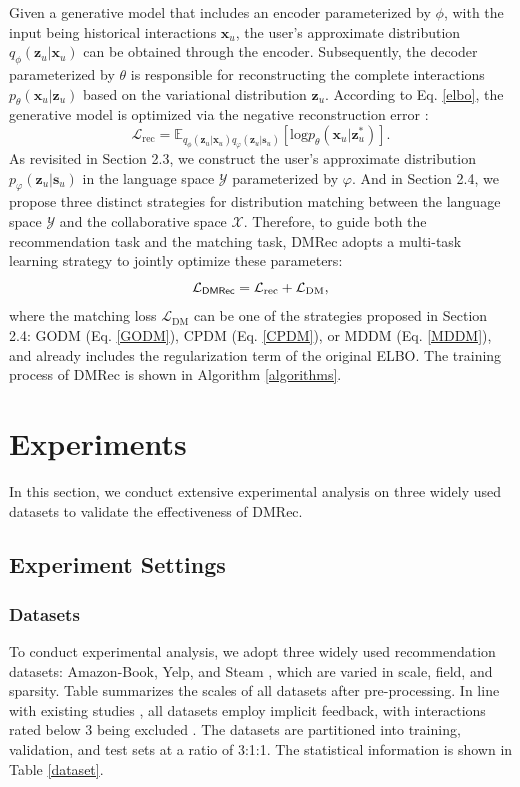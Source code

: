 \documentclass[sigconf]{acmart}
\begin{document}
Given a generative model that includes an encoder parameterized by $\phi$, with the input being historical interactions $\mathbf x_u$, the user's approximate distribution $q_{\phi}(\mathbf z_u|\mathbf x_u)$ can be obtained through the encoder. Subsequently, the decoder parameterized by $\theta$ is responsible for reconstructing the complete interactions $p_{\theta}(\mathbf x_u|\mathbf z_u) $ based on the variational distribution $\mathbf z_u$. According to Eq. \ref{elbo}, the generative model is optimized via the negative reconstruction error \cite{liang2018variational}:
\begin{equation}
\label{reconstruction}
\mathcal L_{\text{rec}}= \mathbb E_{q_{\phi}(\mathbf z_u|\mathbf x_u)q_{\varphi}(\mathbf z_u|\mathbf s_u)}[\text{log}p_{\theta}(\mathbf x_u|\mathbf z_u^*)].
\end{equation}
As revisited in Section 2.3, we construct the user's approximate distribution $p_{\varphi}(\mathbf z_u|\mathbf s_u)$ in the language space $\mathcal Y$ parameterized by $\varphi$. And in Section 2.4, we propose three distinct strategies for distribution matching between the language space $\mathcal Y$ and the collaborative space $\mathcal X$. Therefore, to guide both the recommendation task and the matching task, \textsf{DMRec} adopts a multi-task learning strategy to jointly optimize these parameters:
\begin{equation}
\mathcal L_{\text{\textsf{DMRec}}}= \mathcal L_{\text{rec}} + \mathcal L_{\text{DM}},
\end{equation}
where the matching loss $\mathcal L_{\text{DM}}$ can be one of the strategies proposed in Section 2.4: GODM (Eq. \ref{GODM}), CPDM (Eq. \ref{CPDM}), or MDDM (Eq. \ref{MDDM}), and already includes the regularization term of the original ELBO. The training process of \textsf{DMRec} is shown in Algorithm \ref{algorithms}.

\section{Experiments}
In this section, we conduct extensive experimental analysis on three widely used datasets to validate the effectiveness of \textsf{DMRec}.
\subsection{Experiment Settings}
\subsubsection{\textbf{Datasets}} To conduct experimental analysis, we adopt three widely used recommendation datasets: Amazon-Book, Yelp, and Steam \cite{ren2024representation}, which are varied in scale, field, and sparsity. Table summarizes the scales of all datasets after pre-processing. In line with existing studies \cite{liang2018variational, he2020lightgcn}, all datasets employ implicit feedback, with interactions rated below 3 being excluded \cite{ren2024representation}. The datasets are partitioned into training, validation, and test sets at a ratio of 3:1:1. The statistical information is shown in Table \ref{dataset}.
\end{document}
